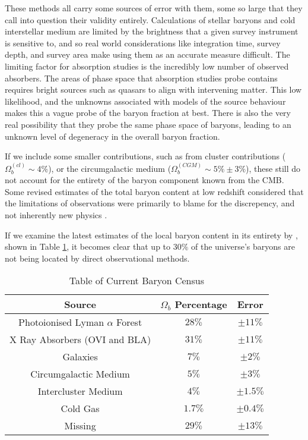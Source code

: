 These methods all carry some sources of error with them, some so large that they call into question their validity entirely. Calculations of stellar baryons and cold interstellar medium are limited by the brightness that a given survey instrument is sensitive to, and so real world considerations like integration time, survey depth, and survey area make using them as an accurate measure difficult. The limiting factor for absorption studies is the incredibly low number of observed absorbers. The areas of phase space that absorption studies probe contains requires bright sources such as quasars to align with intervening matter. This low likelihood, and the unknowns associated with models of the source behaviour makes this a vague probe of the baryon fraction at best. There is also the very real possibility that they probe the same phase space of baryons, leading to an unknown level of degeneracy in the overall baryon fraction. 

\par If we include some smaller contributions, such as from cluster contributions ($\Omega_b^{(cl)} \sim 4 \%$)\citep{2004ApJ...616..643F}, or the circumgalactic medium ($\Omega_b^{(CGM)} \sim 5 \% \pm 3\%$), these still do not account for the entirety of the baryon component known from the CMB. Some revised estimates of the total baryon content at low redshift considered that the limitations of observations were primarily to blame for the discrepency, and not inherently new physics \citep{1994MNRAS.267...13B, 1998ApJ...503..518F}.

\par If we examine the latest estimates of the local baryon content in its entirety by \cite{2012ApJ...759...23S}, shown in Table \ref{table:baryon_census}, it becomes clear that up to $30 \%$ of the universe's baryons are not being located by direct observational methods.

\begin{table}[h!]
\centering
\begin{tabular}{||c c c||} 
 \hline
 Source & $\Omega_b$ Percentage & Error \\
 \hline\hline
 Photoionised Lyman $\alpha$ Forest & $28\%$ & $\pm 11 \%$ \\
 \hline
 X Ray Absorbers (OVI and BLA) & $31\%$ & $\pm 11 \%$ \\
 \hline
 Galaxies & $7\%$ & $\pm 2\%$ \\
 \hline
 Circumgalactic Medium  & $5\%$ & $\pm 3 \%$  \\
 \hline
 Intercluster Medium  & $4\%$ & $\pm 1.5 \%$ \\
 \hline
 Cold Gas  & $1.7\%$ & $\pm 0.4 \%$ \\
 \hline \hline
 Missing & $29 \% $ & $\pm 13\%$ \\
 \hline
\end{tabular}
\caption{Table of Current Baryon Census}
\label{table:baryon_census}
\end{table}


